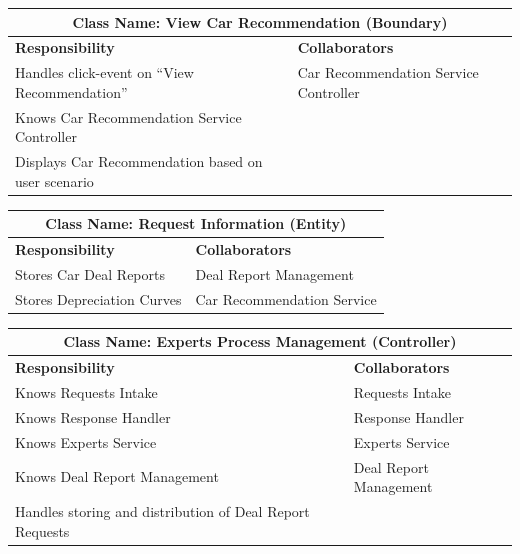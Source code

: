 \documentclass[]{article}
\begin{document}
\begin{table}[H]
  \centering
  \renewcommand{\arraystretch}{1.3} %
  \begin{tabular}{|p{7.5cm}|p{7.5cm}|}
    \hline
    \multicolumn{2}{|c|}{\textbf{Class Name: View Car Recommendation (Boundary)}}              \\
    \hline
    \textbf{Responsibility}                            & \textbf{Collaborators}                \\
    \hline
    Handles click-event on “View Recommendation”       & Car Recommendation Service Controller \\
    Knows Car Recommendation Service Controller        &                                       \\
    Displays Car Recommendation based on user scenario &                                       \\
    \hline
  \end{tabular}
  \label{tab:crc_card}
\end{table}

\begin{table}[H]
  \centering
  \renewcommand{\arraystretch}{1.3} %
  \begin{tabular}{|p{7.5cm}|p{7.5cm}|}
    \hline
    \multicolumn{2}{|c|}{\textbf{Class Name: Request Information (Entity)}} \\
    \hline
    \textbf{Responsibility}    & \textbf{Collaborators}                     \\
    \hline
    Stores Car Deal Reports    & Deal Report Management \\
    Stores Depreciation Curves & Car Recommendation Service \\
    \hline
  \end{tabular}
  \label{tab:crc_card}
\end{table}

\begin{table}[H]
  \centering
  \renewcommand{\arraystretch}{1.3} %
  \begin{tabular}{|p{7.5cm}|p{7.5cm}|}
    \hline
    \multicolumn{2}{|c|}{\textbf{Class Name: Experts Process Management (Controller)}} \\
    \hline
    \textbf{Responsibility}                                  & \textbf{Collaborators}  \\
    \hline
    Knows Requests Intake                                    & Requests Intake         \\
    Knows Response Handler                                   & Response Handler        \\
    Knows Experts Service                                    & Experts Service         \\
    Knows Deal Report Management                             & Deal Report Management  \\
    Handles storing and distribution of Deal Report Requests &                         \\
    \hline
  \end{tabular}
  \label{tab:crc_card}
\end{table}
\end{document}
